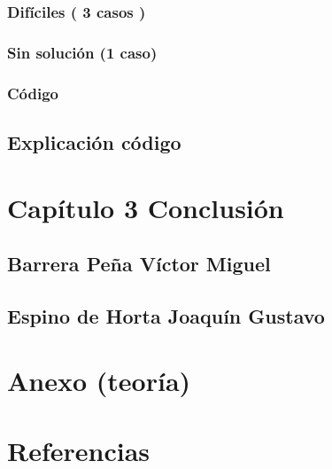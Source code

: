 \documentclass[
  spanish,
]{article}
\begin{document}
\hypertarget{difuxedciles-3-casos}{%
\subsubsection{Difíciles ( 3 casos )}\label{difuxedciles-3-casos}}

\hypertarget{sin-soluciuxf3n-1-caso}{%
\subsubsection{Sin solución (1 caso)}\label{sin-soluciuxf3n-1-caso}}

\hypertarget{cuxf3digo}{%
\subsubsection{Código}\label{cuxf3digo}}

\hypertarget{explicaciuxf3n-cuxf3digo}{%
\subsection{Explicación código}\label{explicaciuxf3n-cuxf3digo}}

\hypertarget{capuxedtulo-3-conclusiuxf3n}{%
\section{Capítulo 3 Conclusión}\label{capuxedtulo-3-conclusiuxf3n}}

\hypertarget{barrera-peuxf1a-vuxedctor-miguel}{%
\subsection{Barrera Peña Víctor
Miguel}\label{barrera-peuxf1a-vuxedctor-miguel}}

\hypertarget{espino-de-horta-joaquuxedn-gustavo}{%
\subsection{Espino de Horta Joaquín
Gustavo}\label{espino-de-horta-joaquuxedn-gustavo}}

\hypertarget{anexo-teoruxeda}{%
\section{Anexo (teoría)}\label{anexo-teoruxeda}}

\hypertarget{referencias}{%
\section{Referencias}\label{referencias}}
\end{document}
